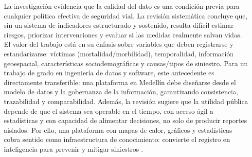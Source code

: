 La investigación evidencia que la calidad del dato es una condición previa para cualquier política efectiva de seguridad vial. La revisión sistemática concluye que, sin un sistema de indicadores estructurado y sostenido, resulta difícil estimar riesgos, priorizar intervenciones y evaluar si las medidas realmente salvan vidas. El valor del trabajo está en su énfasis sobre variables que deben registrarse y estandarizarse: víctimas (mortalidad/morbilidad), temporalidad, información geoespacial, características sociodemográficas y causas/tipos de siniestro. Para un trabajo de grado en ingeniería de datos y software, este antecedente es directamente transferible: una plataforma en Medellín debe diseñarse desde el modelo de datos y la gobernanza de la información, garantizando consistencia, trazabilidad y comparabilidad. Además, la revisión sugiere que la utilidad pública depende de que el sistema sea operable en el tiempo, con acceso ágil a estadísticas y con capacidad de alimentar decisiones, no solo de producir reportes aislados. Por ello, una plataforma con mapas de calor, gráficos y estadísticas cobra sentido como infraestructura de conocimiento: convierte el registro en inteligencia para prevenir y mitigar siniestros \cite{oviedo2025}.  
